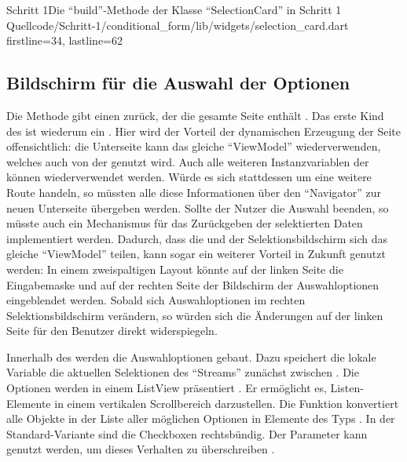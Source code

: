 \clearpage

\begin{alexlisting}{Schritt 1}{Die \enquote{build}-Methode der Klasse \enquote{SelectionCard} in Schritt 1}
  {Quellcode/Schritt-1/conditional_form/lib/widgets/selection_card.dart}
  {firstline=34, lastline=62}
  \label{lst:Schritt1BuildMethodeDerSelectionCard}
\end{alexlisting}


\subsection{Bildschirm für die Auswahl der Optionen}

 
Die Methode   gibt einen  zurück,
der die gesamte Seite enthält .
Das erste Kind des  ist wiederum ein  .
Hier wird der Vorteil der dynamischen Erzeugung der Seite offensichtlich: die Unterseite kann das gleiche \enquote{ViewModel} wiederverwenden, welches auch von der  genutzt wird.
Auch alle weiteren Instanzvariablen der  können wiederverwendet werden.
Würde es sich stattdessen um eine weitere Route handeln, so müssten alle diese Informationen über den \enquote{Navigator} zur neuen Unterseite übergeben werden.
Sollte der Nutzer die Auswahl beenden, so müsste auch ein Mechanismus für das Zurückgeben der selektierten Daten implementiert werden.
Dadurch, dass die  und der Selektionsbildschirm sich das gleiche \enquote{ViewModel} teilen,
kann sogar ein weiterer Vorteil in Zukunft genutzt werden:
In einem zweispaltigen Layout könnte auf der linken Seite die Eingabemaske und auf der rechten Seite der Bildschirm der Auswahloptionen eingeblendet werden.
Sobald sich Auswahloptionen im rechten Selektionsbildschirm verändern, so würden sich die Änderungen auf der linken Seite für den Benutzer direkt widerspiegeln.

Innerhalb des  werden die Auswahloptionen gebaut.
Dazu speichert die lokale Variable  die aktuellen Selektionen des \enquote{Streams} zunächst zwischen .
Die Optionen werden in einem ListView präsentiert .
Er ermöglicht es, Listen-Elemente in einem vertikalen Scrollbereich darzustellen.
Die Funktion  konvertiert alle Objekte in der Liste aller möglichen Optionen  in Elemente des Typs  .
In der Standard-Variante sind die Checkboxen rechtsbündig.
Der Parameter  kann genutzt werden, um dieses Verhalten zu überschreiben .

